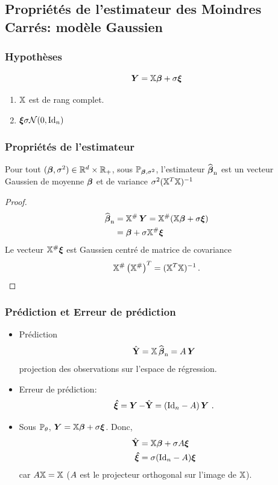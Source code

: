 \subsection{Propriétés de l'estimateur des Moindres Carrés: modèle Gaussien}

\begin{frame}
\frametitle{Hypothèses}
\[
\operatorname{\boldsymbol{Y}}= \mathbb{X} \boldsymbol{\beta} + \sigma \boldsymbol{\xi}
\]
\begin{enumerate}
\item \alert<1>{$\mathbb{X}$ est de rang complet.}
\item \alert<2>{$\boldsymbol{\xi} \sigma \mathcal{N}(0,\mathrm{Id}_{n})$}
\end{enumerate}
\end{frame}


\begin{frame}
\frametitle{Propriétés de l'estimateur}
\begin{theo}
Pour tout $(\boldsymbol{\beta},\sigma^2) \in \mathbb{R}^d \times \mathbb{R}_+$, sous $\operatorname{{\mathbb P}}_{\boldsymbol{\beta},\sigma^2}$, l'estimateur
$\operatorname{\widehat{\boldsymbol{\beta}}_n}$ est un vecteur Gaussien de moyenne $\boldsymbol{\beta}$ et de variance $\sigma^2(\mathbb{X}^T \mathbb{X})^{-1}$
\end{theo}
\begin{proof}
\begin{align*}
\operatorname{\widehat{\boldsymbol{\beta}}_n}
&= \mathbb{X}^{\#} \operatorname{\boldsymbol{Y}} = \mathbb{X}^{\#} (\mathbb{X} \boldsymbol{\beta} + \sigma \boldsymbol{\xi}) \\
&= \boldsymbol{\beta} + \sigma \mathbb{X}^{\#} \boldsymbol{\xi}
\end{align*}
Le vecteur $\mathbb{X}^{\#} \boldsymbol{\xi}$ est Gaussien centré de matrice de covariance
\[
\mathbb{X}^{\#} \left( \mathbb{X}^{\#} \right)^T = (\mathbb{X}^T \mathbb{X})^{-1} \,.
\]
\end{proof}
\end{frame}


\begin{frame}
\frametitle{Prédiction et Erreur de prédiction}
\begin{itemize}
\item \alert{Prédiction}
\[
\hat{\mathbf{Y}}= \mathbb{X} \operatorname{\widehat{\boldsymbol{\beta}}_n} = A \operatorname{\boldsymbol{Y}}
\]
projection des observations sur l'espace de régression.
\item \alert{Erreur de prédiction}:
\[
\boldsymbol{\hat{\xi}} = \operatorname{\boldsymbol{Y}} - \hat{\mathbf{Y}} = (\mathrm{Id}_{n} - A) \operatorname{\boldsymbol{Y}} \,.
\]
\item Sous $\operatorname{{\mathbb P}}_\theta$, $\operatorname{\boldsymbol{Y}}= \mathbb{X} \boldsymbol{\beta} +  \sigma \boldsymbol{\xi}$. Donc,
\begin{align*}
\hat{\mathbf{Y}}    &= \mathbb{X} \boldsymbol{\beta} + \sigma A \boldsymbol{\xi} \\
\boldsymbol{\hat{\xi}}  &= \sigma (\mathrm{Id}_{n}-A) \boldsymbol{\xi}
\end{align*}
car $A \mathbb{X}= \mathbb{X}$ ($A$ est le projecteur orthogonal sur l'image de $\mathbb{X}$).
\end{itemize}
\end{frame}


